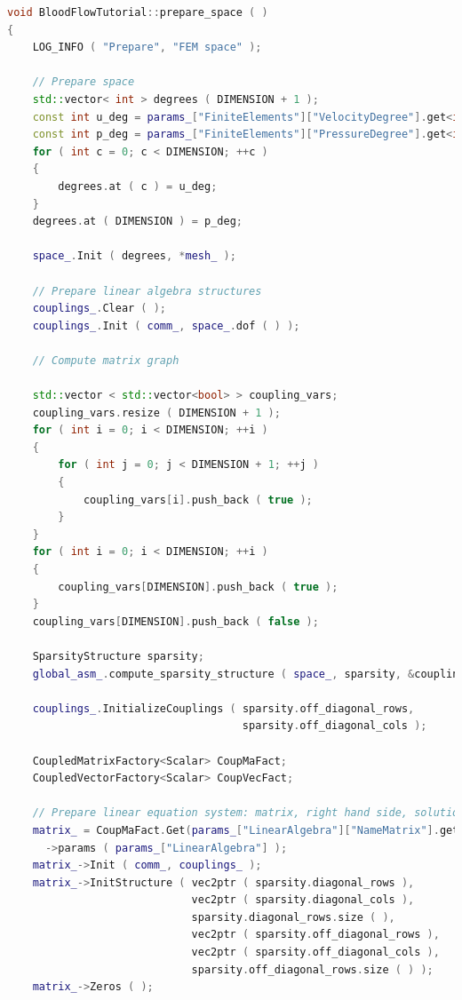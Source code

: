 \documentclass[a4paper, 11pt, twoside]{article}
\begin{document}
\begin{lstlisting}[language=C++, basicstyle={\footnotesize, \ttfamily}, keywordstyle=\color{blue},  numbers=none, tabsize=4]
void BloodFlowTutorial::prepare_space ( )
{
    LOG_INFO ( "Prepare", "FEM space" );

    // Prepare space
    std::vector< int > degrees ( DIMENSION + 1 );
    const int u_deg = params_["FiniteElements"]["VelocityDegree"].get<int>( );
    const int p_deg = params_["FiniteElements"]["PressureDegree"].get<int>( );
    for ( int c = 0; c < DIMENSION; ++c )
    {
        degrees.at ( c ) = u_deg;
    }
    degrees.at ( DIMENSION ) = p_deg;

    space_.Init ( degrees, *mesh_ );

    // Prepare linear algebra structures
    couplings_.Clear ( );
    couplings_.Init ( comm_, space_.dof ( ) );

    // Compute matrix graph

    std::vector < std::vector<bool> > coupling_vars;
    coupling_vars.resize ( DIMENSION + 1 );
    for ( int i = 0; i < DIMENSION; ++i )
    {
        for ( int j = 0; j < DIMENSION + 1; ++j )
        {
            coupling_vars[i].push_back ( true );
        }
    }
    for ( int i = 0; i < DIMENSION; ++i )
    {
        coupling_vars[DIMENSION].push_back ( true );
    }
    coupling_vars[DIMENSION].push_back ( false );

    SparsityStructure sparsity;
    global_asm_.compute_sparsity_structure ( space_, sparsity, &coupling_vars );

    couplings_.InitializeCouplings ( sparsity.off_diagonal_rows,
                                     sparsity.off_diagonal_cols );

    CoupledMatrixFactory<Scalar> CoupMaFact;
    CoupledVectorFactory<Scalar> CoupVecFact;

    // Prepare linear equation system: matrix, right hand side, solution, previous solution
    matrix_ = CoupMaFact.Get(params_["LinearAlgebra"]["NameMatrix"].get<std::string>())
      ->params ( params_["LinearAlgebra"] );
    matrix_->Init ( comm_, couplings_ );
    matrix_->InitStructure ( vec2ptr ( sparsity.diagonal_rows ),
                             vec2ptr ( sparsity.diagonal_cols ),
                             sparsity.diagonal_rows.size ( ),
                             vec2ptr ( sparsity.off_diagonal_rows ),
                             vec2ptr ( sparsity.off_diagonal_cols ),
                             sparsity.off_diagonal_rows.size ( ) );
    matrix_->Zeros ( );


\end{lstlisting}
\end{document}
